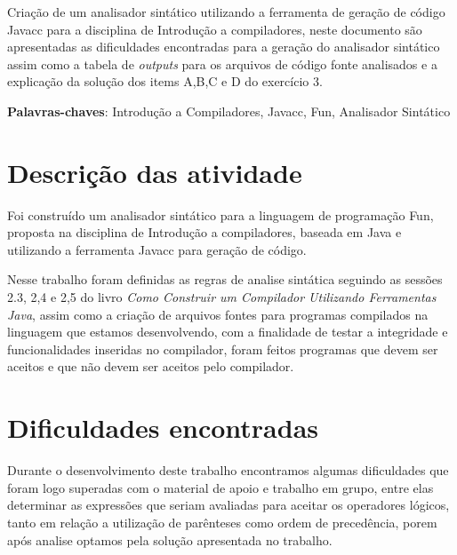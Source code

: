\documentclass[
	article,			%
	11pt,				%
	oneside,			%
	a4paper,			%
	portuguese,			%
	brazil,				%
	sumario=tradicional
	]{abntex2}
\begin{document}
\frenchspacing 

\maketitle

\begin{resumoumacoluna}
Criação de um analisador sintático utilizando a ferramenta de geração de código Javacc para a disciplina de Introdução a compiladores, neste documento
são apresentadas as dificuldades encontradas para a geração do analisador sintático assim como a tabela de \textit{outputs} para os arquivos de código fonte analisados e a explicação
da solução dos items A,B,C e D do exercício 3.

 \vspace{\onelineskip}
 
 \noindent
 \textbf{Palavras-chaves}: Introdução a Compiladores, Javacc, Fun, Analisador Sintático
\end{resumoumacoluna}

\newpage
\tableofcontents*
\newpage

\textual
\section{Descrição das atividade}

Foi construído um analisador sintático para a linguagem de programação Fun, proposta na disciplina de Introdução a compiladores, baseada em Java e utilizando a 
ferramenta Javacc para geração de código.

Nesse trabalho foram definidas as regras de analise sintática seguindo as sessões 2.3, 2,4 e 2,5 do livro \textit{Como Construir um Compilador Utilizando Ferramentas Java}, assim como a criação de arquivos fontes para programas compilados na linguagem que estamos desenvolvendo, com a finalidade de testar a integridade e funcionalidades inseridas no compilador, foram feitos programas que devem ser aceitos e que não devem ser aceitos pelo compilador.
 

\section{Dificuldades encontradas}

Durante o desenvolvimento deste trabalho encontramos algumas dificuldades que foram logo superadas com o material de apoio e trabalho em grupo, entre elas determinar as expressões que seriam avaliadas para aceitar os operadores lógicos, tanto em relação a utilização de parênteses como ordem de precedência, porem após analise optamos pela solução apresentada no trabalho.
\end{document}
